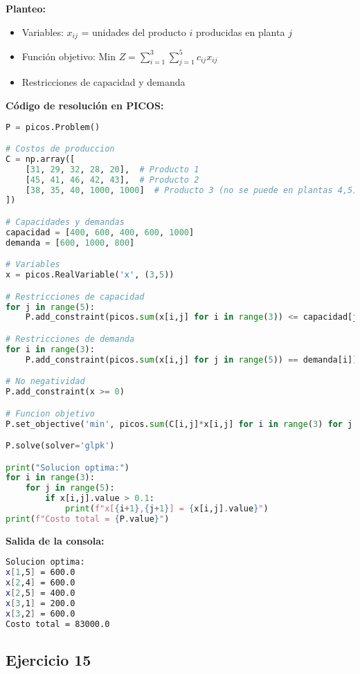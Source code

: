 \documentclass[12pt]{article}
\begin{document}
\textbf{Planteo:}
\begin{itemize}
\item Variables: $x_{ij}$ = unidades del producto $i$ producidas en planta $j$
\item Función objetivo: Min $Z = \sum_{i=1}^3 \sum_{j=1}^5 c_{ij}x_{ij}$
\item Restricciones de capacidad y demanda
\end{itemize}

\textbf{Código de resolución en PICOS:}
\begin{lstlisting}[language=Python]
P = picos.Problem()

# Costos de produccion
C = np.array([
    [31, 29, 32, 28, 20],  # Producto 1
    [45, 41, 46, 42, 43],  # Producto 2
    [38, 35, 40, 1000, 1000]  # Producto 3 (no se puede en plantas 4,5)
])

# Capacidades y demandas
capacidad = [400, 600, 400, 600, 1000]
demanda = [600, 1000, 800]

# Variables
x = picos.RealVariable('x', (3,5))

# Restricciones de capacidad
for j in range(5):
    P.add_constraint(picos.sum(x[i,j] for i in range(3)) <= capacidad[j])

# Restricciones de demanda
for i in range(3):
    P.add_constraint(picos.sum(x[i,j] for j in range(5)) == demanda[i])

# No negatividad
P.add_constraint(x >= 0)

# Funcion objetivo
P.set_objective('min', picos.sum(C[i,j]*x[i,j] for i in range(3) for j in range(5)))

P.solve(solver='glpk')

print("Solucion optima:")
for i in range(3):
    for j in range(5):
        if x[i,j].value > 0.1:
            print(f"x[{i+1},{j+1}] = {x[i,j].value}")
print(f"Costo total = {P.value}")
\end{lstlisting}

\textbf{Salida de la consola:}
\begin{lstlisting}[language=bash,backgroundcolor=\color{black},basicstyle=\color{white}\ttfamily,numbers=none]
Solucion optima:
x[1,5] = 600.0
x[2,4] = 600.0
x[2,5] = 400.0
x[3,1] = 200.0
x[3,2] = 600.0
Costo total = 83000.0
\end{lstlisting}

\subsection*{Ejercicio 15}
\end{document}
